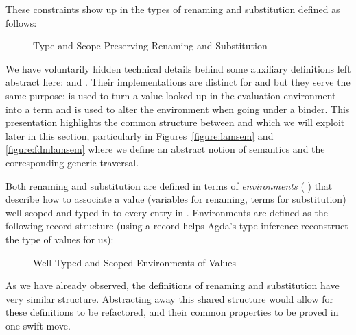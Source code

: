 These constraints show up in the types of renaming and substitution defined as follows:

\begin{figure}[h]
\begin{minipage}{0.45\textwidth}
\end{minipage}\hspace{2em}
\begin{minipage}{0.45\textwidth}
\end{minipage}
\caption{Type and Scope Preserving Renaming and Substitution}
\end{figure}

We have voluntarily hidden technical details behind some auxiliary definitions
left abstract here:  and . Their implementations are distinct
for  and  but they serve the same purpose:  is used to
turn a value looked up in the evaluation environment into a term and 
is used to alter the environment when going under a binder. This presentation
highlights the common structure between  and  which we will exploit
later in this section, particularly in Figures~\ref{figure:lamsem} and \ref{figure:fdmlamsem}
where we define an abstract notion of semantics and the corresponding generic traversal.

Both renaming and substitution are defined in terms of \emph{environments}
{( )  } that describe how to associate a value 
(variables for renaming, terms for substitution) well scoped and typed in 
to every entry in . Environments are defined as the following record
structure (using a record helps Agda's type inference reconstruct the type of
values  for us):

\begin{figure}[h]
\caption{Well Typed and Scoped Environments of Values}
\end{figure}

As we have already observed, the definitions of renaming and substitution have very
similar structure. Abstracting away this shared structure would allow for these
definitions to be refactored, and their common properties to be proved in one swift
move.

